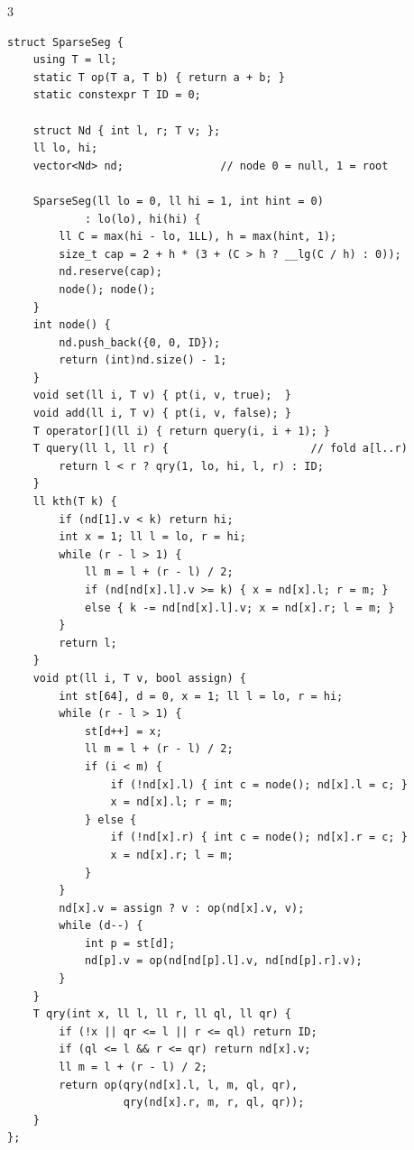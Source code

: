 \documentclass[9pt,a4paper]{extarticle}
\begin{document}
\begin{multicols*}{3}
\begin{lstlisting}
struct SparseSeg {
    using T = ll;
    static T op(T a, T b) { return a + b; }
    static constexpr T ID = 0;

    struct Nd { int l, r; T v; };
    ll lo, hi;
    vector<Nd> nd;               // node 0 = null, 1 = root

    SparseSeg(ll lo = 0, ll hi = 1, int hint = 0)
            : lo(lo), hi(hi) {
        ll C = max(hi - lo, 1LL), h = max(hint, 1);
        size_t cap = 2 + h * (3 + (C > h ? __lg(C / h) : 0));
        nd.reserve(cap);
        node(); node();
    }
    int node() {
        nd.push_back({0, 0, ID});
        return (int)nd.size() - 1;
    }
    void set(ll i, T v) { pt(i, v, true);  }
    void add(ll i, T v) { pt(i, v, false); }
    T operator[](ll i) { return query(i, i + 1); }
    T query(ll l, ll r) {                      // fold a[l..r)
        return l < r ? qry(1, lo, hi, l, r) : ID;
    }
    ll kth(T k) {
        if (nd[1].v < k) return hi;
        int x = 1; ll l = lo, r = hi;
        while (r - l > 1) {
            ll m = l + (r - l) / 2;
            if (nd[nd[x].l].v >= k) { x = nd[x].l; r = m; }
            else { k -= nd[nd[x].l].v; x = nd[x].r; l = m; }
        }
        return l;
    }
    void pt(ll i, T v, bool assign) {
        int st[64], d = 0, x = 1; ll l = lo, r = hi;
        while (r - l > 1) {
            st[d++] = x;
            ll m = l + (r - l) / 2;
            if (i < m) {
                if (!nd[x].l) { int c = node(); nd[x].l = c; }
                x = nd[x].l; r = m;
            } else {
                if (!nd[x].r) { int c = node(); nd[x].r = c; }
                x = nd[x].r; l = m;
            }
        }
        nd[x].v = assign ? v : op(nd[x].v, v);
        while (d--) {
            int p = st[d];
            nd[p].v = op(nd[nd[p].l].v, nd[nd[p].r].v);
        }
    }
    T qry(int x, ll l, ll r, ll ql, ll qr) {
        if (!x || qr <= l || r <= ql) return ID;
        if (ql <= l && r <= qr) return nd[x].v;
        ll m = l + (r - l) / 2;
        return op(qry(nd[x].l, l, m, ql, qr),
                  qry(nd[x].r, m, r, ql, qr));
    }
};
\end{lstlisting}


\end{multicols*}
\end{document}
